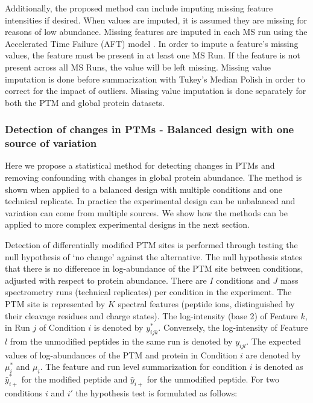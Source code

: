 \documentclass[mcp]{article}
\numberwithin{table}{section}
\begin{document}
Additionally, the proposed method can include imputing missing feature intensities if desired. When values are imputed, it is assumed they are missing for reasons of low abundance. Missing features are imputed in each MS run using the Accelerated Time Failure (AFT) model \cite{Tukey:1977}. In order to impute a feature's missing values, the feature must be present in at least one MS Run. If the feature is not present across all MS Runs, the value will be left missing. Missing value imputation is done before summarization with Tukey's Median Polish in order to correct for the impact of outliers. Missing value imputation is done separately for both the PTM and global protein datasets.

\subsubsection*{Detection of changes in PTMs - Balanced design with one source of variation}
\label{sec:adjustment_summary}

Here we propose a statistical method for detecting changes in PTMs and removing confounding with changes in global protein abundance. The method is shown when applied to a balanced design with multiple conditions and one technical replicate. In practice the experimental design can be unbalanced and variation can come from multiple sources. We show how the methods can be applied to more complex experimental designs in the next section.

Detection of differentially modified PTM sites is performed through testing the null hypothesis of ‘no change’ against the alternative. The null hypothesis states that there is no difference in log-abundance of the PTM site between conditions, adjusted with respect to protein abundance. There are $I$ conditions and $J$ mass spectrometry runs (technical replicates) per condition in the experiment. The PTM site is represented by $K$ spectral features (peptide ions, distinguished by their cleavage residues and charge states). The log-intensity (base 2) of Feature $k$, in Run $j$ of Condition $i$ is denoted by $y_{ijk}^{\ast}$. Conversely, the log-intensity of Feature $l$ from the unmodified peptides in the same run is denoted by $y_{ijl}$. The expected values of log-abundances of the PTM and protein in Condition $i$ are denoted by $\mu_{i}^{\ast}$ and $\mu_{i}$. The feature and run level summarization for condition $i$ is denoted as $\hat{y}_{i+}^{\ast}$ for the modified peptide and $\hat{y}_{i+}$ for the unmodified peptide. For two conditions $i$ and $i'$ the hypothesis test is formulated as follows:
\end{document}
